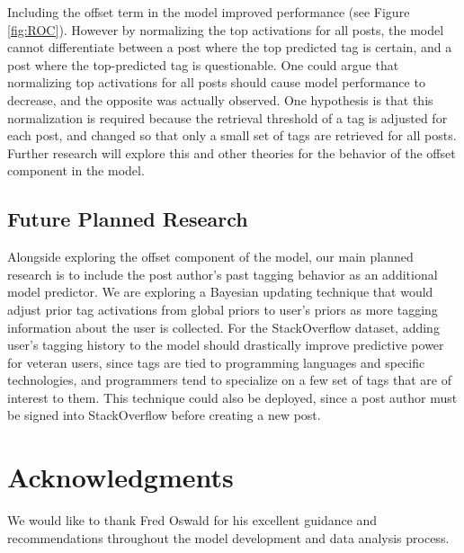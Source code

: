 \documentclass[10pt,letterpaper]{article}
\begin{document}
Including the offset term in the model improved performance (see Figure \ref{fig:ROC}).
However by normalizing the top activations for all posts, the model cannot differentiate between a post where the top predicted tag is certain, and a post where the top-predicted tag is questionable.
One could argue that normalizing top activations for all posts should cause model performance to decrease, and the opposite was actually observed.
One hypothesis is that this normalization is required because the retrieval threshold of a tag is adjusted for each post, and changed so that only a small set of tags are retrieved for all posts.
Further research will explore this and other theories for the behavior of the offset component in the model.

\subsection{Future Planned Research}

Alongside exploring the offset component of the model, our main planned research is to include the post author's past tagging behavior as an additional model predictor.
We are exploring a Bayesian updating technique that would adjust prior tag activations from global priors to user's priors as more tagging information about the user is collected.
For the StackOverflow dataset, adding user's tagging history to the model should drastically improve predictive power for veteran users,
since tags are tied to programming languages and specific technologies, and programmers tend to specialize on a few set of tags that are of interest to them.
This technique could also be deployed, since a post author must be signed into StackOverflow before creating a new post.

\section{Acknowledgments}

We would like to thank Fred Oswald for his excellent guidance and recommendations throughout the model development and data analysis process.


\setlength{\bibleftmargin}{.125in}
\setlength{\bibindent}{-\bibleftmargin}

\end{document}
